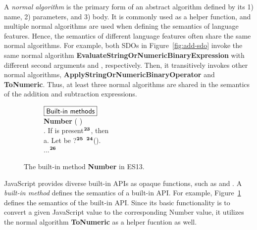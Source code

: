 A \textit{normal algorithm} is the primary form of an abstract algorithm defined
by its 1) name, 2) parameters, and 3) body.
%
It is commonly used as a helper function, and multiple normal algorithms are
used when defining the semantics of language features.
%
Hence, the semantics of different language features often share the same normal
algorithms.
%
For example, both SDOs in Figure~\ref{fig:add-sdo} invoke the same normal
algorithm \textbf{EvaluateStringOrNumericBinaryExpression} with different second
arguments \escode{+} and \escode{-}, respectively.
%
Then, it transitively invokes other normal algorithms,
\textbf{ApplyStringOrNumericBinaryOperator} and \textbf{ToNumeric}.
%
Thus, at least three normal algorithms are shared in the semantics of the
addition and subtraction expressions.


\begin{figure}
  \centering
  \begin{subfigure}{\textwidth}
    \small
    $\fbox{\textsf{Built-in methods}}$
    \vspace*{0.5em}\\
    \textbf{Number} (  )
    \\
    \null{}. If  is present${}^{\textbf{23}}$, then
    \\
    \null\quad\quad a. Let  be ?${}^{\textbf{25}}$
    ${}^{\textbf{24}}$().
    \\
    \null\quad ...${}^{\textbf{26}}$
  \end{subfigure}
  \caption{
    The built-in method \textbf{Number} in ES13.
  }
  \label{fig:builtin-number}
\end{figure}

JavaScript provides diverse built-in APIs as opaque functions, such as
 and .
%
A \textit{built-in method} defines the semantics of a built-in API.
%
For example, Figure~\ref{fig:builtin-number} defines the semantics of the
 built-in API.
%
Since its basic functionality is to convert a given JavaScript value to the
corresponding Number value, it utilizes the normal algorithm \textbf{ToNumeric}
as a helper fucntion as well.


